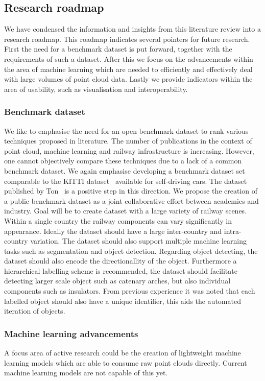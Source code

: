 \subsection{Research roadmap}\label{subsec:stoa:roadmap}
We have condensed the information and insights from this literature review into a research roadmap. This roadmap indicates several pointers for future research. First the need for a benchmark dataset is put forward, together with the requirements of such a dataset. After this we focus on the advancements within the area of machine learning which are needed to efficiently and effectively deal with large volumes of point cloud data. Lastly we provide indicators within the area of usability, such as visualisation and interoperability.

\subsubsection{Benchmark dataset}
We like to emphasise the need for an open benchmark dataset to rank various techniques proposed in literature. The number of publications in the context of point cloud, machine learning and railway infrastructure is increasing. However, one cannot objectively compare these techniques due to a lack of a common benchmark dataset. We again emphasise developing a benchmark dataset set comparable to the KITTI dataset~\cite{kitti} available for self-driving cars. The dataset published by Ton~\cite{ton2022labelled} is a positive step in this direction. We propose the creation of a public benchmark dataset as a joint collaborative effort between academics and industry. Goal will be to create dataset with a large variety of railway scenes. Within a single country the railway components can vary significantly in appearance. Ideally the dataset should have a large inter-country and intra-country variation. The dataset should also support multiple machine learning tasks such as segmentation and object detection. Regarding object detecting, the dataset should also encode the directionallity of the object. Furthermore a hierarchical labelling scheme is recommended, the dataset should facilitate detecting larger scale object such as catenary arches, but also individual components such as insulators. From previous experience it was noted that each labelled object should also have a unique identifier, this aids the automated iteration of objects.

\subsubsection{Machine learning advancements}
A focus area of active research could be the creation of lightweight machine learning models which are able to consume raw point clouds directly. Current machine learning models are not capable of this yet.
 
